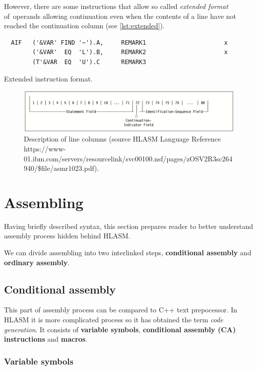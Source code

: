 However, there are some instructions that allow so called \textit{extended format} of~operands allowing continuation even when the contents of a line have not reached  the continuation column (see \cref{lst:extended}).
\begin{listing}
\begin{verbatim}
  AIF   ('&VAR' FIND '~').A,     REMARK1                      x
        ('&VAR'  EQ  'L').B,     REMARK2                      x
        (T'&VAR  EQ  'U').C      REMARK3 
\end{verbatim} 
\caption{Extended instruction format.}
\label{lst:extended}
\end{listing}

\begin{figure}
	\includegraphics[width=\textwidth]{img/line}
	\caption{Description of line columns (source HLASM Language Reference https://www-01.ibm.com/servers/resourcelink/\-svc00100.nsf/\-pages/\-zOSV2R3sc264940/\-\$file/\-asmr1023.pdf).}
	\label{fig01:line}
\end{figure}


\section{Assembling}

Having briefly described syntax, this section prepares reader to better understand assembly process hidden behind HLASM. 

We can divide assembling into two interlinked steps, \textbf{conditional assembly} and \textbf{ordinary assembly}.

\subsection{Conditional assembly}

This part of assembly process can be compared to C++ text prepocessor. In HLASM it is more complicated process so it has obtained the term \textit{code generation}. It consists of \textbf{variable symbols}, \textbf{conditional assembly (CA) instructions} and \textbf{macros}. 


\subsubsection{Variable symbols}

